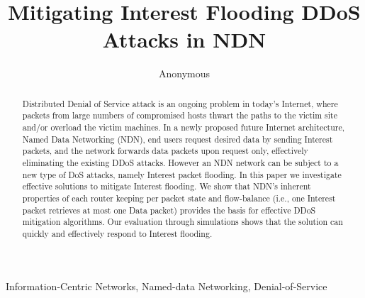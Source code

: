 \documentclass[conference]{IEEEtran}
\title{Mitigating Interest Flooding DDoS Attacks in NDN}%
\author{Anonymous}
\begin{document}
\maketitle

\begin{abstract}
Distributed Denial of Service attack is an ongoing problem in today's Internet, where packets from large numbers of compromised hosts thwart the paths to the victim site and/or overload the victim machines. 
In a newly proposed future Internet architecture, Named Data Networking (NDN), end users request desired data by sending Interest packets, and the network forwards data packets upon request only, effectively eliminating the existing DDoS attacks. 
However an NDN network can be subject to a new type of DoS attacks, namely Interest packet flooding.  
In this paper we investigate effective solutions to mitigate Interest flooding.
We show that NDN's inherent properties of each router keeping per packet state and flow-balance (i.e., one Interest packet retrieves at most one Data packet) provides the  basis for effective DDoS mitigation algorithms.
Our evaluation through simulations shows that the solution can quickly and effectively respond to Interest flooding.
\end{abstract}

\begin{IEEEkeywords}
Information-Centric Networks, Named-data Networking, Denial-of-Service
\end{IEEEkeywords}





















{\small 

}
\end{document}
